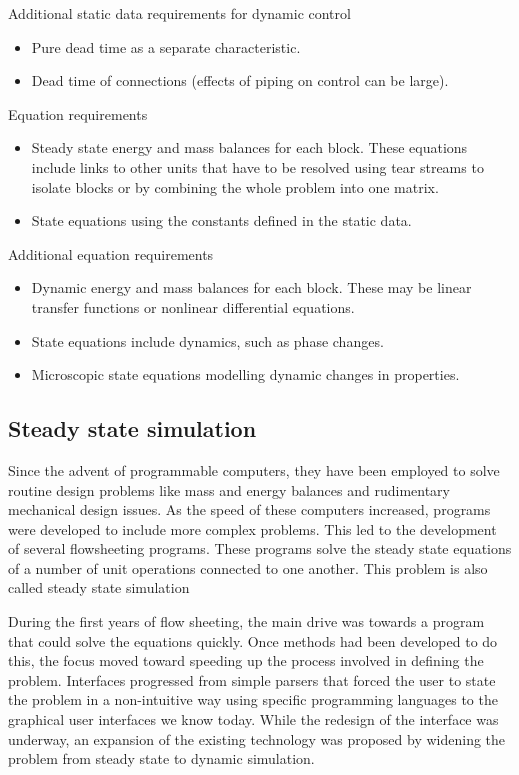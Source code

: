 Additional static data requirements for dynamic control
\begin{itemize}
\item Pure dead time as a separate characteristic.
\item Dead time of connections (effects of piping on control can be large).
\end{itemize}

Equation requirements
\begin{itemize}
\item Steady state energy and mass balances for each block.
These equations include links to other units that have to be resolved using tear streams to isolate blocks or by combining the whole problem into one matrix.
\item State equations using the constants defined in the static data.
\end{itemize}

Additional equation requirements
\begin{itemize}
\item Dynamic energy and mass balances for each block.
  These may be linear transfer functions or nonlinear differential equations.
\item State equations include dynamics, such as phase changes. 
\item Microscopic state equations modelling dynamic changes in properties.
\end{itemize}

\subsection{Steady state simulation}
Since the advent of programmable computers, they have been employed to solve routine design problems like mass and energy balances and rudimentary mechanical design issues.  
As the speed of these computers increased, programs were developed to include more complex problems. 
This led to the development of several flowsheeting programs.  
These programs solve the steady state equations of a number of unit operations connected to one another.  
This problem is also called steady state simulation \citep{westerberg.hutchison.ea1979process}

During the first years of flow sheeting, the main drive was towards a program that could solve the equations quickly.  
Once methods had been developed to do this, the focus moved toward speeding up the process involved in defining the problem.  
Interfaces progressed from simple parsers that forced the user to state the problem in a non-intuitive way using specific programming languages to the graphical user interfaces we know today.  
While the redesign of the interface was underway, an expansion of the existing technology was proposed by widening the problem from steady state to dynamic simulation.

